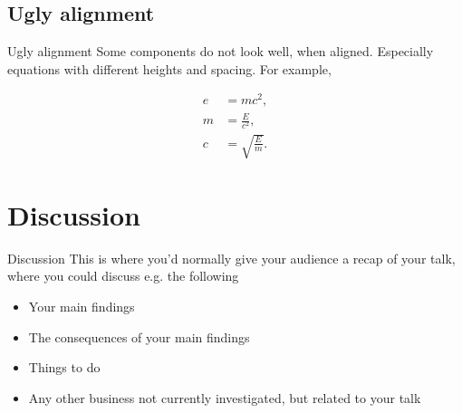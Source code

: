 \documentclass{beamer}
\begin{document}
\subsection{Ugly alignment}
\begin{frame}{Ugly alignment}
Some components do not look well, when aligned. Especially equations with different heights and spacing. For example,

\begin{align}
    e &= mc^2,\\
    m &= \frac{E}{c^2},\\
    c &= \sqrt{\frac{E}{m}}.
\end{align}
    
\end{frame}

\section{Discussion}
\begin{frame}{Discussion}
This is where you’d normally give your audience a recap of your talk, where you could discuss e.g. the following

\begin{itemize}
  \item Your main findings
  \item The consequences of your main findings
  \item Things to do
  \item Any other business not currently investigated, but related to your talk
\end{itemize}
    
\end{frame}
\end{document}
